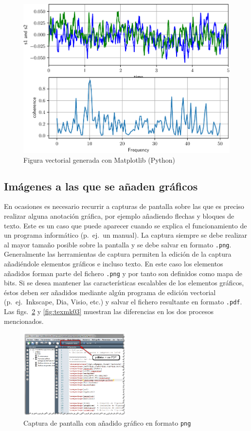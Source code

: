 \documentclass[11pt,a4paper]{article}
\begin{document}
\begin{figure}[hbt]
	\centering
	\includegraphics[width=0.8\linewidth]{fig2_py}
	\caption[Figura hecha desde Python]{Figura vectorial generada con Matplotlib (Python)}
	\label{fig:python}
\end{figure}


\subsection{Imágenes a las que se añaden gráficos}
En ocasiones es necesario recurrir a capturas de pantalla sobre las que es preciso realizar alguna anotación gráfica, por ejemplo añadiendo flechas y bloques de texto. Este es un caso que puede aparecer cuando se explica el funcionamiento de un programa informático (p.~ej.\ un manual). La captura siempre se debe realizar al mayor tamaño posible sobre la pantalla y se debe salvar en formato \texttt{.png}. Generalmente las herramientas de captura permiten la edición de la captura añadiéndole elementos gráficos e incluso texto. En este caso los elementos añadidos 
forman parte del fichero \texttt{.png} y por tanto son definidos como mapa de bits. Si se desea mantener las características escalables de los elementos gráficos, éstos deben ser añadidos mediante algún programa de edición vectorial (p.~ej.\ 
\textsf{Inkscape}, \textsf{Dia}, \textsf{Visio}, etc.) y salvar el fichero resultante en formato \texttt{.pdf}. Las figs.~\ref{fig:texmk02} y \ref{fig:texmk03} muestran las diferencias en los dos procesos mencionados.

\begin{figure}[hbt]
	\centering
	\includegraphics[width=0.5\textwidth]{texmk02} 
	\caption[Captura con gráfico en \texttt{png}]{Captura de pantalla con añadido gráfico en formato \texttt{png}}
	\label{fig:texmk02}
\end{figure}
\end{document}
